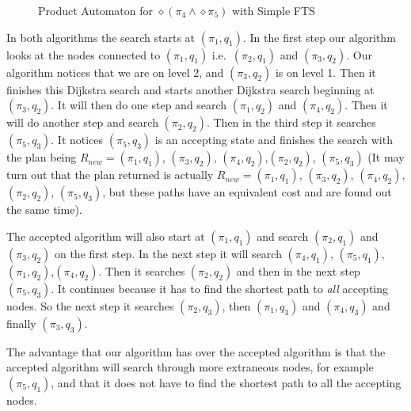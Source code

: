 \begin{figure}
\caption{Product Automaton for $\diamond (\pi_4 \wedge \diamond \pi_5)$ with Simple FTS}
\label{fig:Sequencing}
\end{figure}
In both algorithms the search starts at $(\pi_1,q_1)$. In the first step our algorithm looks at the nodes connected to $(\pi_1,q_1)$ i.e.\ $(\pi_2,q_1)$ and $(\pi_3,q_2)$. Our algorithm notices that we are on level 2, and $(\pi_3,q_2)$ is on level 1. Then it finishes this Dijkstra search and starts another Dijkstra search beginning at $(\pi_3,q_2)$. It will then do one step and search $(\pi_1,q_2)$ and $(\pi_4,q_2)$. Then it will do another step and search $(\pi_2,q_2)$. Then in the third step it searches $(\pi_5,q_3)$. It notices $(\pi_5,q_3)$ is an accepting state and finishes the search with the plan being $R_{new} = (\pi_1,q_1)$, $(\pi_3,q_2)$, $(\pi_4,q_2)$,$(\pi_2,q_2)$, $(\pi_5,q_3)$ (It may turn out that the plan returned is actually $R_{new}=(\pi_1,q_1)$, $(\pi_3,q_2)$, $(\pi_4,q_2)$,$(\pi_2,q_2)$, $(\pi_5,q_3)$, but these paths have an equivalent cost and are found out the same time). 

The accepted algorithm will also start at $(\pi_1,q_1)$ and search $(\pi_2,q_1)$ and $(\pi_3,q_2)$ on the first step. In the next step it will search $(\pi_4,q_1)$, $(\pi_5,q_1)$, $(\pi_1,q_2)$,$(\pi_4,q_2)$. Then it searches $(\pi_2,q_2)$ and then in the next step $(\pi_5,q_3)$. It continues because it has to find the shortest path to \textit{all} accepting nodes. So the next step it searches $(\pi_2,q_3)$, then $(\pi_1,q_3)$ and $(\pi_4,q_3)$ and finally $(\pi_3,q_3)$.

The advantage that our algorithm has over the accepted algorithm is that the accepted algorithm will search through more extraneous nodes, for example $(\pi_5,q_1)$, and that it does not have to find the shortest path to all the accepting nodes. %


